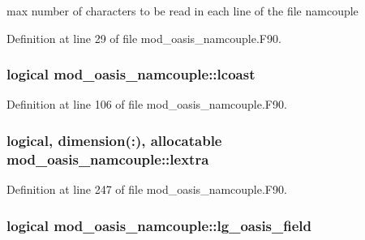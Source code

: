 max number of characters to be read in each line of the file namcouple 



Definition at line 29 of file mod\+\_\+oasis\+\_\+namcouple.\+F90.

\hypertarget{classmod__oasis__namcouple_a7657e0f9b495e291f26dc31b4f6145aa}{
\subsubsection[{lcoast}]{\setlength{\rightskip}{0pt plus 5cm}logical mod\+\_\+oasis\+\_\+namcouple\+::lcoast\hspace{0.3cm}{\ttfamily [private]}}}\label{classmod__oasis__namcouple_a7657e0f9b495e291f26dc31b4f6145aa}


Definition at line 106 of file mod\+\_\+oasis\+\_\+namcouple.\+F90.

\hypertarget{classmod__oasis__namcouple_a2febd0d97dea9ecc3ce4a8c5088a8d1f}{
\subsubsection[{lextra}]{\setlength{\rightskip}{0pt plus 5cm}logical, dimension(\+:), allocatable mod\+\_\+oasis\+\_\+namcouple\+::lextra\hspace{0.3cm}{\ttfamily [private]}}}\label{classmod__oasis__namcouple_a2febd0d97dea9ecc3ce4a8c5088a8d1f}


Definition at line 247 of file mod\+\_\+oasis\+\_\+namcouple.\+F90.

\hypertarget{classmod__oasis__namcouple_aaf6b923ffc7763fd37a5c4c72bdfa34d}{
\subsubsection[{lg\+\_\+oasis\+\_\+field}]{\setlength{\rightskip}{0pt plus 5cm}logical mod\+\_\+oasis\+\_\+namcouple\+::lg\+\_\+oasis\+\_\+field\hspace{0.3cm}{\ttfamily [private]}}}\label{classmod__oasis__namcouple_aaf6b923ffc7763fd37a5c4c72bdfa34d}



